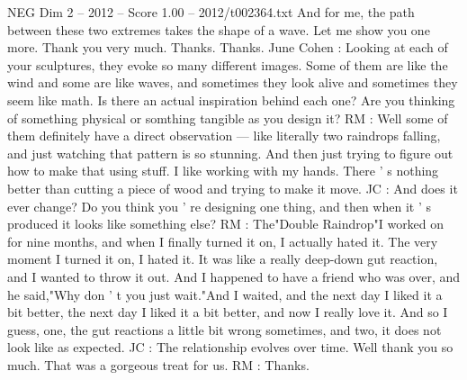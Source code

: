 \begin{textsample}{NEG Dim 2 – 2012 – Score 1.00 – 2012/t002364.txt}
And for me, the path between these two extremes takes the shape of a wave.
Let me show you one more.
Thank you very much.
Thanks.
Thanks.
June Cohen : Looking at each of your sculptures, they evoke so many different images.
Some of them are like the wind and some are like waves, and sometimes they look alive and sometimes they seem like math.
Is there an actual inspiration behind each one?
Are you thinking of something physical or somthing tangible as you design it?
RM : Well some of them definitely have a direct observation — like literally two raindrops falling, and just watching that pattern is so stunning.
And then just trying to figure out how to make that using stuff.
I like working with my hands.
There ' s nothing better than cutting a piece of wood and trying to make it move.
JC : And does it ever change?
Do you think you ' re designing one thing, and then when it ' s produced it looks like something else?
RM : The"Double Raindrop"I worked on for nine months, and when I finally turned it on, I actually hated it.
The very moment I turned it on, I hated it.
It was like a really deep-down gut reaction, and I wanted to throw it out.
And I happened to have a friend who was over, and he said,"Why don ' t you just wait."And I waited, and the next day I liked it a bit better, the next day I liked it a bit better, and now I really love it.
And so I guess, one, the gut reactions a little bit wrong sometimes, and two, it does not look like as expected.
JC : The relationship evolves over time.
Well thank you so much.
That was a gorgeous treat for us.
RM : Thanks.

\end{textsample}
